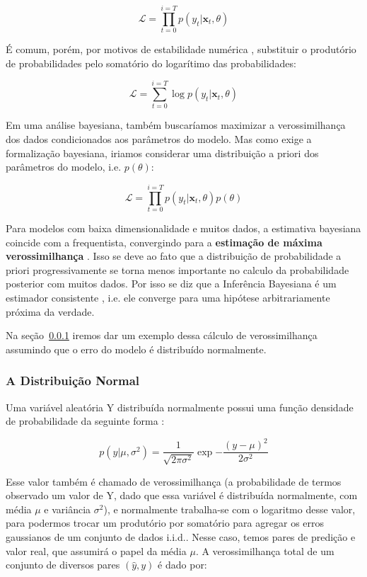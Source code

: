 \[
\mathcal{L} = \prod_{t=0}^{i=T} p(y_t | \textbf{x}_{t}, \theta) 
\]

É comum, porém, por motivos de estabilidade numérica \citep{dlbook}, substituir
o produtório de probabilidades pelo somatório do logarítimo das probabilidades: 

\[
  \mathcal{L} = \sum_{t=0}^{i=T} \log{p(y_t | \textbf{x}_{t},\theta)}
\]

Em uma análise bayesiana, também buscaríamos maximizar a verossimilhança dos
dados condicionados aos parâmetros do modelo. Mas como exige a formalização
bayesiana, iriamos considerar uma distribuição a priori dos parâmetros do
modelo, i.e. $p(\theta)$:


\[
  \mathcal{L} = \prod_{t=0}^{i=T}p(y_t|\textbf{x}_{t},\theta)p(\theta) 
\]


Para modelos com baixa dimensionalidade e muitos dados, a estimativa bayesiana
coincide com a frequentista, convergindo para a \textbf{estimação de máxima
verossimilhança} \citep{mlprob}. Isso se deve ao fato que a distribuição de
probabilidade a priori progressivamente se torna menos importante no calculo da
probabilidade posterior com muitos dados. Por isso se diz que a Inferência
Bayesiana é um estimador consistente \citep{mlprob}, i.e. ele converge para uma
hipótese arbitrariamente próxima da verdade.


Na seção~\ref{sec:reglog} iremos dar um exemplo dessa cálculo de verossimilhança
assumindo que o erro do modelo é distribuído normalmente.

\subsubsection{A Distribuição Normal}
\label{sec:reglog}

Uma variável aleatória Y distribuída normalmente possui uma função densidade de
probabilidade da seguinte forma \citep{mlprob}:

\begin{equation}
  \label{eq:ver}
p(y| \mu,\sigma^2) = \frac{1}{\sqrt{2\pi\sigma^2}}\exp{-\frac{(y - \mu)^2}{2\sigma^2}}
\end{equation}

Esse valor também é chamado de verossimilhança (a probabilidade de termos
observado um valor de Y, dado que essa variável é distribuída normalmente, com média $\mu$ e variância $\sigma^2$), e
normalmente trabalha-se com o logaritmo desse valor, para podermos trocar um
produtório por somatório para agregar os erros gaussianos de um conjunto de dados
i.i.d.. Nesse caso, temos pares de predição e valor real, que assumirá o papel
da média $\mu$. A verossimilhança total de um conjunto de diversos pares
$(\hat{y},y)$ é dado por: 

